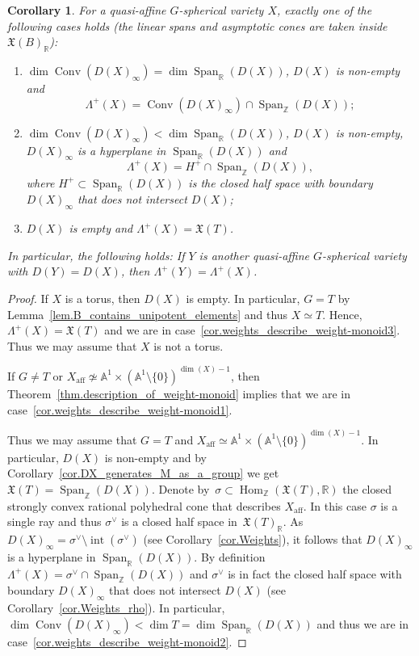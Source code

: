 \documentclass[JEP,XML,SOM,Unicode]{cedram}
\let\oldvee\vee
\renewcommand{\vee}{{\scriptscriptstyle\oldvee}}
\theoremstyle{plain}
\newtheorem{corollary}[theorem]{Corollary}
\theoremstyle{definition}
\DeclareMathOperator{\Hom}{Hom}
\DeclareMathOperator{\aff}{aff}
\DeclareMathOperator{\Conv}{Conv}
\DeclareMathOperator{\Span}{Span}
\DeclareMathOperator{\inter}{int}
\newcommand{\RR}{\mathbb{R}}
\newcommand{\ZZ}{\mathbb{Z}}
\renewcommand{\AA}{\mathbb{A}}
\begin{document}
\begin{corollary}
\label{cor.weights_describe_weight-monoid}
For a quasi-affine $G$-spherical variety $X$, exactly one of the following cases holds
(the linear spans and asymptotic cones are taken inside $\mathfrak{X}(B)_{\RR}$):
\begin{enumerate}
\item \label{cor.weights_describe_weight-monoid1}
$\dim \Conv(D(X)_{\infty}) = \dim \Span_{\RR}(D(X))$, $D(X)$ is non-empty and
\[
\Lambda^+(X) = \Conv ( D(X)_{\infty}) \cap \Span_{\ZZ}(D(X));
\]
\item \label{cor.weights_describe_weight-monoid2}
$\dim \Conv(D(X)_{\infty}) < \dim \Span_{\RR}(D(X))$, $D(X)$ is non-empty,
$D(X)_{\infty}$ is a hyperplane in $\Span_{\RR}(D(X))$ and
\[
\Lambda^+(X) = H^+ \cap \Span_{\ZZ}(D(X)),
\]
where $H^+ \subset \Span_{\RR}(D(X))$
is the closed half space with boundary $D(X)_{\infty}$
that does not intersect $D(X)$;
\item \label{cor.weights_describe_weight-monoid3}
$D(X)$ is empty and $\Lambda^+(X) = \mathfrak{X}(T)$.
\end{enumerate}
In particular, the following holds:
If $Y$ is another quasi-affine $G$-spherical variety with $D(Y) = D(X)$, then
$\Lambda^+(Y) = \Lambda^+(X)$.
\end{corollary}

\begin{proof}
If $X$ is a torus, then $D(X)$ is empty. In particular, $G = T$ by Lemma~\ref{lem.B_contains_unipotent_elements} and thus $X \simeq T$. Hence, $\Lambda^+(X) = \mathfrak{X}(T)$ and we are
in case~\eqref{cor.weights_describe_weight-monoid3}. Thus we may assume that $X$ is not a torus.

If $G \neq T$ or $X_{\aff} \not\simeq \AA^1 \times (\AA^1 \setminus \{0\})^{\dim(X)-1}$, then
Theorem~\ref{thm.description_of_weight-monoid} implies that we
are in case~\eqref{cor.weights_describe_weight-monoid1}.

Thus we may assume that $G = T$ and
$X_{\aff} \simeq \AA^1 \times (\AA^1 \setminus \{0\})^{\dim(X)-1}$. In particular, $D(X)$ is non-empty
and by Corollary~\ref{cor.DX_generates_M_as_a_group} we get $\mathfrak{X}(T) = \Span_{\ZZ}(D(X))$.
Denote by~$\sigma \subset \Hom_{\ZZ}(\mathfrak{X}(T), \RR)$ the closed strongly
convex rational polyhedral cone that describes $X_{\aff}$.
In this case $\sigma$ is a single ray and thus
$\sigma^\vee$ is a closed half space in~$\mathfrak{X}(T)_\RR$.
As $D(X)_\infty = \sigma^\vee \setminus \inter(\sigma^\vee)$ (see Corollary~\ref{cor.Weights}),
it follows that $D(X)_\infty$ is a hyperplane in $\Span_{\RR}(D(X))$.
By definition $\Lambda^+(X) = \sigma^\vee \cap \Span_{\ZZ}(D(X))$ and
$\sigma^\vee$ is in fact the closed half space with boundary
$D(X)_\infty$ that does not intersect $D(X)$ (see Corollary~\ref{cor.Weights_rho}).
In particular, $\dim \Conv(D(X)_\infty) < \dim T = \dim \Span_{\RR}(D(X))$
and thus we are in case~\eqref{cor.weights_describe_weight-monoid2}.
\end{proof}
\end{document}
